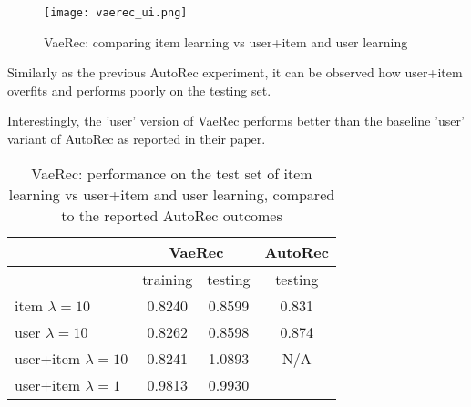 \begin{figure}[H]
\centering
\texttt{[image: vaerec\_ui.png]}
\caption{VaeRec: comparing item learning vs user+item and user learning}
\label{vaerec_ui_fig}
\end{figure}

Similarly as the previous AutoRec experiment, it can be observed how user+item overfits and performs poorly on the testing
set.

Interestingly, the 'user' version of VaeRec performs better than the baseline 'user' variant
of AutoRec as reported in their paper.

\begin{table}[H]
\centering
\caption{VaeRec: performance on the test set of item learning vs user+item and user learning, compared to the reported AutoRec outcomes \cite{Sedhain2015}}
 \begin{tabular}{||l | c c |c||} 
 \hline
 & \multicolumn{2}{c}{VaeRec} & AutoRec \\ \hline
 & training & testing & testing \\ \hline
item $\lambda=10$& 0.8240&0.8599 & 0.831 \\
user $\lambda=10$ & 0.8262&0.8598 & 0.874 \\
user+item $\lambda=10$ & 0.8241 & 1.0893 & N/A\\
user+item $\lambda=1$ &0.9813 & 0.9930 &\\
\hline
\end{tabular}
\end{table}

